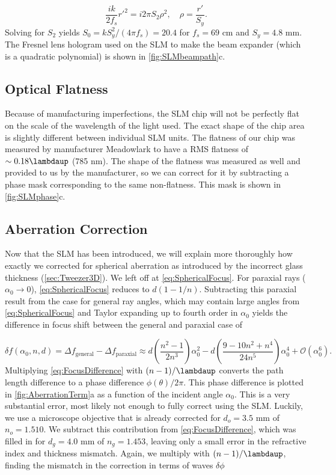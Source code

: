 \begin{equation}
    \frac{i k }{2 f_{s}}r'^2=i 2\pi S_2 \rho^2, \quad \rho = \frac{r'}{S_y}.
\end{equation}
Solving for $S_2$ yields $S_0 = k S_y^2/(4\pi f_s)= 20.4$ for $f_{s} = 69$ cm and  $S_y = 4.8$ mm.
The Fresnel lens hologram used on the SLM to make the beam expander (which is a quadratic polynomial) is shown in \ref{fig:SLMbeampath}c.


\subsection{Optical Flatness}\label{subsec:Flatness}

Because of manufacturing imperfections, the SLM chip will not be perfectly flat on the scale of the wavelength of the light used. 
The exact shape of the chip area is slightly different between individual SLM units.
The flatness of our chip was measured by manufacturer Meadowlark to have a RMS flatness of $\sim 0.18\lambdaup$ (785 nm).
The shape of the flatness was measured as well and provided to us by the manufacturer, so we can correct for it by subtracting a phase mask corresponding to the same non-flatness.
This mask is shown in \ref{fig:SLMphase}c.


\subsection{Aberration Correction}\label{subsec:AberrationCorrection}

Now that the SLM has been introduced, we will explain more thoroughly how exactly we corrected for spherical aberration as introduced by the incorrect glass thickness (\cref{sec:Tweezer3D}).
We left off at \cref{eq:SphericalFocus}.
For paraxial rays ($\alpha_0 \rightarrow 0$), \cref{eq:SphericalFocus} reduces to $d(1-1/n)$. 
Subtracting this paraxial result from the case for general ray angles, which may contain large angles from \cref{eq:SphericalFocus} and Taylor expanding up to fourth order in $\alpha_0$ yields the difference in focus shift between the general and paraxial case of \cite{Iwaniuk2011}

\begin{equation}\label{eq:FocusDifference}
    \delta f(\alpha_0,n,d)= \Delta f_{\text{general}} - \Delta f_{\text{paraxial}} \approx
    d\left(\frac{n^2-1}{2n^3}\right)\alpha_0^2 - d\left(\frac{9-10n^2+n^4}{24n^5}\right)\alpha_0^4+\mathcal{O}(\alpha_0^6).
\end{equation}
Multiplying \cref{eq:FocusDifference} with $(n-1)/\lambdaup$ converts the path length difference to a phase difference $\phi(\theta)/2\pi$.
This phase difference is plotted in \cref{fig:AberrationTerm}a as a function of the incident angle $\alpha_0$.
This is a very substantial error, most likely not enough to fully correct using the SLM. 
Luckily, we use a microscope objective that is already corrected for $d_o=3.5$ mm of $n_o=1.510$. 
We subtract this contribution from \cref{eq:FocusDifference}, which was filled in for $d_g=4.0$ mm of $n_g=1.453$, leaving only a small error in the refractive index and thickness mismatch.
Again, we multiply with $(n-1)/\lambdaup$, finding the mismatch in the correction in terms of waves $\delta \phi$

